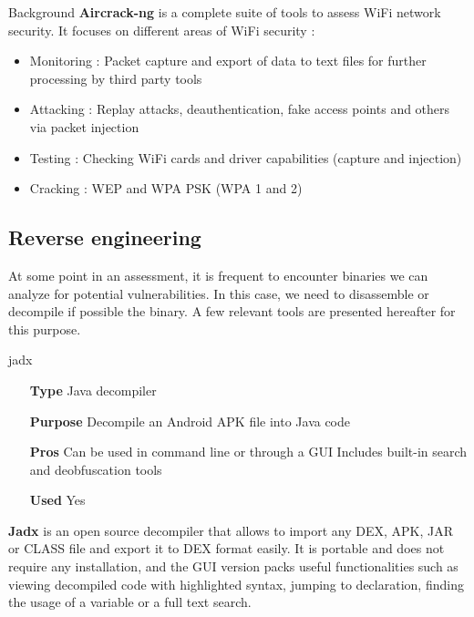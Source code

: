 \begin{chaptercover}{Background}
\textbf{Aircrack-ng} \cite{aircrack-ng} is a complete suite of tools to assess WiFi network security. It focuses on different areas of WiFi security :
\begin{itemize}[itemsep=0.05cm,topsep=0.05cm]
  \item Monitoring : Packet capture and export of data to text files for further processing by third party tools
  \item Attacking : Replay attacks, deauthentication, fake access points and others via packet injection
  \item Testing : Checking WiFi cards and driver capabilities (capture and injection)
  \item Cracking : WEP and WPA PSK (WPA 1 and 2)
\end{itemize}

\subsection{Reverse engineering}

At some point in an assessment, it is frequent to encounter binaries we can analyze for potential vulnerabilities. In this case, we need to disassemble or decompile if possible the binary. A few relevant tools are presented hereafter for this purpose.

\begin{solutiondata}{jadx}
\begin{itemize}[labelsep=1cm]
  \item [\textbf{Type}] Java decompiler
  \item [\textbf{Purpose}] Decompile an Android APK file into Java code
  \item [\textbf{Pros}] Can be used in command line or through a GUI \newline Includes built-in search and deobfuscation tools
  \item [\textbf{Used}] Yes
\end{itemize}
\end{solutiondata}

\textbf{Jadx} \cite{jadx} is an open source decompiler that allows to import any DEX, APK, JAR or CLASS file and export it to DEX format easily. It is portable and does not require any installation, and the GUI version packs useful functionalities such as viewing decompiled code with highlighted syntax, jumping to declaration, finding the usage of a variable or a full text search.


\end{chaptercover}
